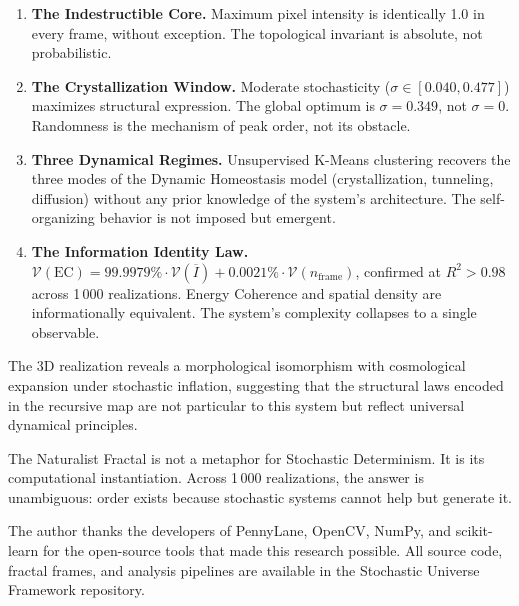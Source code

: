 \documentclass[twocolumn,amsmath,amssymb,prl]{revtex4-2}
\begin{document}
\begin{enumerate}
  \item \textbf{The Indestructible Core.}  Maximum pixel intensity is
        identically 1.0 in every frame, without exception.  The topological
        invariant is absolute, not probabilistic.

  \item \textbf{The Crystallization Window.}  Moderate stochasticity
        ($\sigma \in [0.040, 0.477]$) maximizes structural expression.
        The global optimum is $\sigma = 0.349$, not $\sigma = 0$.
        Randomness is the mechanism of peak order, not its obstacle.

  \item \textbf{Three Dynamical Regimes.}  Unsupervised K-Means clustering
        recovers the three modes of the Dynamic Homeostasis model
        (crystallization, tunneling, diffusion) without any prior knowledge
        of the system's architecture.  The self-organizing behavior is
        not imposed but emergent.

  \item \textbf{The Information Identity Law.}
        $\mathcal{V}(\text{EC}) = 99.9979\%\cdot\mathcal{V}(\overline{I})
        + 0.0021\%\cdot\mathcal{V}(n_{\text{frame}})$,
        confirmed at $R^2 > 0.98$ across 1\,000 realizations.
        Energy Coherence and spatial density are informationally equivalent.
        The system's complexity collapses to a single observable.
\end{enumerate}

The 3D realization reveals a morphological isomorphism with cosmological
expansion under stochastic inflation, suggesting that the structural laws
encoded in the recursive map are not particular to this system but reflect
universal dynamical principles.

The Naturalist Fractal is not a metaphor for Stochastic Determinism.  It is
its computational instantiation.  Across 1\,000 realizations, the answer is
unambiguous: order exists because stochastic systems cannot help but generate
it.

\begin{acknowledgments}
The author thanks the developers of PennyLane, OpenCV, NumPy, and scikit-learn
for the open-source tools that made this research possible.  All source code,
fractal frames, and analysis pipelines are available in the Stochastic Universe
Framework repository.
\end{acknowledgments}
\end{document}
